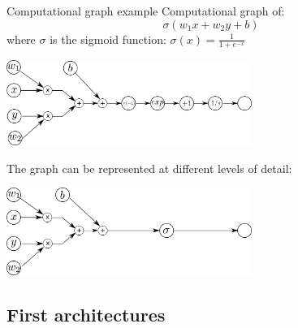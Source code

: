 \documentclass[xcolor=pdftex,dvipsnames,table,mathserif]{beamer}
\begin{document}
\begin{frame}{Computational graph example}
  Computational graph of:
  \[
  \sigma(w_1x + w_2y + b)
  \]
  where $\sigma$ is the sigmoid function: $\sigma(x) = \frac{1}{1 + e^{-x}}$

  \pause

  \centering
  \begin{block}{}
    \centering
   \includegraphics[width=0.6\textwidth]{comp_graph2}\\
   \end{block}

  \pause

  The graph can be represented at different levels of detail:
 \begin{block}{}
    \centering
  \includegraphics[width=0.6\textwidth]{comp_graph}
   \end{block}

\end{frame}




\subsection{First architectures}
\end{document}
